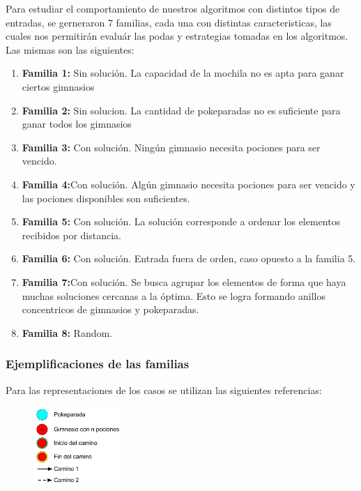 \indent Para estudiar el comportamiento de nuestros algoritmos con distintos tipos de entradas, se gerneraron 7 familias, cada una con distintas caracteristicas, las cuales nos permitirán evaluár las  podas y estrategias tomadas en los algoritmos. Las mismas son las siguientes:

\begin{enumerate}
\item {\bf Familia 1:}  Sin solución. La capacidad de la mochila no es apta para ganar ciertos gimnasios
\item {\bf Familia 2:} Sin solucion. La cantidad de pokeparadas no es suficiente para ganar todos los gimnasios
\item {\bf Familia 3:} Con solución. Ning\'un gimnasio necesita pociones para ser vencido.
\item {\bf Familia 4:}Con solución. Algún gimnasio necesita pociones para ser vencido y las pociones disponibles son suficientes.
\item {\bf Familia 5:} Con solución. La solución corresponde a ordenar los elementos recibidos por distancia.
\item {\bf Familia 6:} Con solución. Entrada fuera de orden, caso opuesto a la familia 5.
\item {\bf Familia 7:}Con solución. Se busca agrupar los elementos de forma que haya muchas soluciones cercanas a la óptima. Esto se logra formando anillos concentricos de gimnasios y pokeparadas.
\item {\bf Familia 8:} Random.
\end{enumerate}


 \subsubsection*{Ejemplificaciones de las familias}
 
Para las representaciones de los casos se utilizan las siguientes referencias:
\begin{figure} [!ht]
\center
 \includegraphics[width=0.30\textwidth]{./EJ1/referencias.jpeg}
\end{figure}
 
